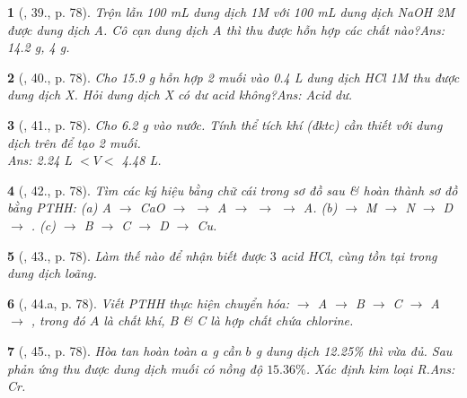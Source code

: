 \documentclass{article}
\newtheorem{baitoan}{}
\begin{document}
\begin{baitoan}[\cite{An_Hoa_Hoc_nang_cao_8_9}, 39., p. 78]
	Trộn lẫn {\rm100 mL} dung dịch {\rm{} 1M} với {\rm100 mL} dung dịch {\rm NaOH 2M} được dung dịch A. Cô cạn dung dịch A thì thu được hỗn hợp các chất nào?\hfill{\sf Ans: 14.2 g, 4 g.}
\end{baitoan}

\begin{baitoan}[\cite{An_Hoa_Hoc_nang_cao_8_9}, 40., p. 78]
	Cho {\rm15.9 g} hỗn hợp 2 muối {\rm{}} vào {\rm0.4 L} dung dịch {\rm HCl 1M} thu được dung dịch X. Hỏi dung dịch X có dư acid không?\hfill{\sf Ans: Acid dư.}
\end{baitoan}

\begin{baitoan}[\cite{An_Hoa_Hoc_nang_cao_8_9}, 41., p. 78]
	Cho {\rm6.2 g } vào nước. Tính thể tích khí {\rm{}} (đktc) cần thiết với dung dịch trên để tạo 2 muối.\\\mbox{}\hfill{\sf Ans: 2.24 L $< V <$ 4.48 L.}
\end{baitoan}

\begin{baitoan}[\cite{An_Hoa_Hoc_nang_cao_8_9}, 42., p. 78]
	Tìm các ký hiệu bằng chữ cái trong sơ đồ sau \& hoàn thành sơ đồ bằng {\rm PTHH}: (a) {\rm A $\to$ CaO $\to$  $\to$ A $\to$  $\to$  $\to$ A}. (b) {\rm{} $\to$ M $\to$ N $\to$ D $\to$ }. (c) {\rm{} $\to$ B $\to$ C $\to$ D $\to$ Cu}.
\end{baitoan}

\begin{baitoan}[\cite{An_Hoa_Hoc_nang_cao_8_9}, 43., p. 78]
	Làm thế nào để nhận biết được $3$ acid {\rm HCl, } cùng tồn tại trong dung dịch loãng.	
\end{baitoan}

\begin{baitoan}[\cite{An_Hoa_Hoc_nang_cao_8_9}, 44.a, p. 78]
	Viết {\rm PTHH} thực hiện chuyển hóa: {\rm{} $\to$ A $\to$ B $\to$ C $\to$ A $\to$ }, trong đó $A$ là chất khí, B \& C là hợp chất chứa chlorine.
\end{baitoan}

\begin{baitoan}[\cite{An_Hoa_Hoc_nang_cao_8_9}, 45., p. 78]
	Hòa tan hoàn toàn $a$ {\rm g } cần $b$ {\rm g} dung dịch {\rm{} 12.25\%} thì vừa đủ. Sau phản ứng thu được dung dịch muối có nồng độ $15.36\%$. Xác định kim loại R.\hfill{\sf Ans: Cr.}
\end{baitoan}
\end{document}
